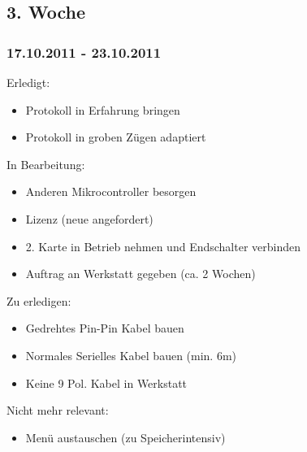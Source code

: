 \documentclass[ngerman]{beamer}
\begin{document}
\subsection{3. Woche}
\begin{frame}\frametitle{17.10.2011 - 23.10.2011}
Erledigt: 
\begin{itemize}
\item Protokoll in Erfahrung bringen 
\item Protokoll in groben Zügen adaptiert 
\end{itemize}
In Bearbeitung: 
\begin{itemize}
\item Anderen Mikrocontroller besorgen 
\item Lizenz (neue angefordert) 
\item 2. Karte in Betrieb nehmen und Endschalter verbinden 
\item Auftrag an Werkstatt gegeben (ca. 2 Wochen) 
\end{itemize}
Zu erledigen: 
\begin{itemize}
\item Gedrehtes Pin-Pin Kabel bauen 
\item Normales Serielles Kabel bauen (min. 6m) 
\item Keine 9 Pol. Kabel in Werkstatt 
\end{itemize}
Nicht mehr relevant:
\begin{itemize}
\item Menü austauschen (zu Speicherintensiv)
\end{itemize}
\end{frame}
\end{document}
